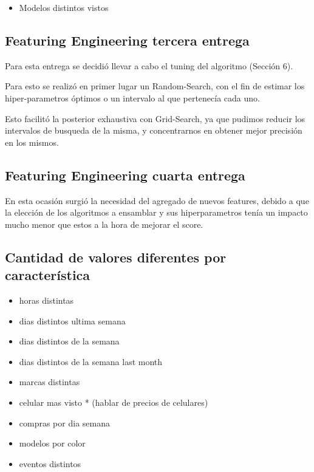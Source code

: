 \documentclass[a4paper ,12pt]{article}
\begin{document}
	\begin{itemize}
		
		\item Modelos distintos vistos
			
	\end{itemize}	

\subsection{Featuring Engineering tercera entrega}

	Para esta entrega se decidió llevar a cabo el tuning del algoritmo (Sección 6).
	
	Para esto se realizó en primer lugar un Random-Search, con el fin de estimar los hiper-parametros óptimos o un intervalo al que pertenecía cada uno.
	
	Esto facilitó la posterior exhaustiva con Grid-Search, ya que pudimos reducir los intervalos de busqueda de la misma, y concentrarnos en obtener mejor precisión en los mismos.

\subsection{Featuring Engineering cuarta entrega}

	En esta ocasión surgió la necesidad del agregado de nuevos features, debido a que la elección de los algoritmos a ensamblar y sus hiperparametros tenía un impacto mucho menor que estos a la hora de mejorar el score.
	
\subsection{Cantidad de valores diferentes por característica}

\begin{itemize}
	\item horas distintas

	\item dias distintos ultima semana

	\item dias distintos de la semana

	\item dias distintos de la semana last month

	\item marcas distintas

	\item celular mas visto * (hablar de precios de celulares)

	\item compras por dia semana

	\item modelos por color

	\item eventos distintos

\end{itemize}
\end{document}
